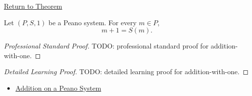 \newpage
{}
\label{prf:addition-with-one}

\begin{remark*}[Return]
\hyperref[thm:addition-with-one]{Return to Theorem}
\end{remark*}

\begin{theorem*}
Let $(P,S,1)$ be a Peano system. For every $m \in P$,
\[
m+1=S(m).
\]
\end{theorem*}

\begin{proof}[Professional Standard Proof]
\LRAProofBodyStart
TODO: professional standard proof for addition-with-one.
\end{proof}

\begin{proof}[Detailed Learning Proof]
\LRAProofBodyStart
TODO: detailed learning proof for addition-with-one.
\end{proof}

\begin{remark*}
\end{remark*}

\begin{dependencies}
\begin{itemize}
  \item \hyperref[def:addition-on-peano-system]{Addition on a Peano System}
\end{itemize}
\end{dependencies}

\clearpage
